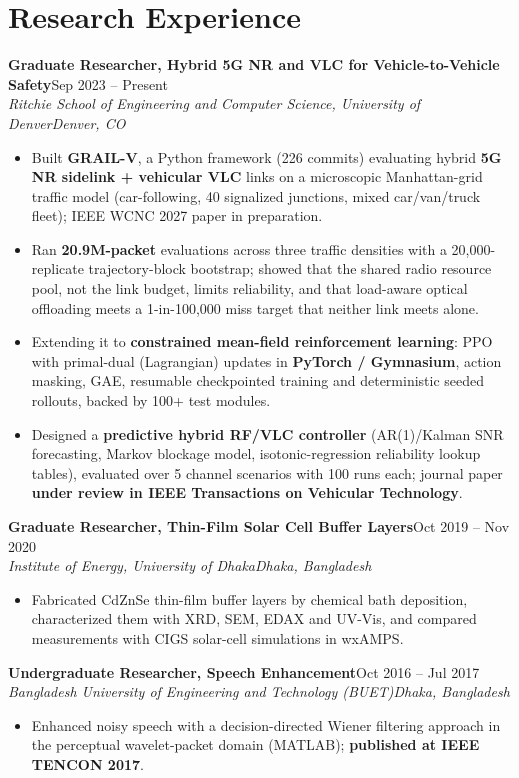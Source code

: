 \documentclass[10pt,letterpaper]{article}
\newcommand{\entry}[4]{\textbf{#1}\hfill #2\\\textit{#3}\hfill\textit{#4}\par}
\begin{document}
\section*{Research Experience}
\entry{Graduate Researcher, Hybrid 5G NR and VLC for Vehicle-to-Vehicle Safety}{Sep 2023 – Present}{Ritchie School of Engineering and Computer Science, University of Denver}{Denver, CO}
\begin{itemize}\item Built \textbf{GRAIL-V}, a Python framework (226 commits) evaluating hybrid \textbf{5G NR sidelink + vehicular VLC} links on a microscopic Manhattan-grid traffic model (car-following, 40 signalized junctions, mixed car/van/truck fleet); IEEE WCNC 2027 paper in preparation.\item Ran \textbf{20.9M-packet} evaluations across three traffic densities with a 20,000-replicate trajectory-block bootstrap; showed that the shared radio resource pool, not the link budget, limits reliability, and that load-aware optical offloading meets a 1-in-100,000 miss target that neither link meets alone.\item Extending it to \textbf{constrained mean-field reinforcement learning}: PPO with primal-dual (Lagrangian) updates in \textbf{PyTorch / Gymnasium}, action masking, GAE, resumable checkpointed training and deterministic seeded rollouts, backed by 100+ test modules.\item Designed a \textbf{predictive hybrid RF/VLC controller} (AR(1)/Kalman SNR forecasting, Markov blockage model, isotonic-regression reliability lookup tables), evaluated over 5 channel scenarios with 100 runs each; journal paper \textbf{under review in IEEE Transactions on Vehicular Technology}.\end{itemize}
\vspace{2pt}
\entry{Graduate Researcher, Thin-Film Solar Cell Buffer Layers}{Oct 2019 – Nov 2020}{Institute of Energy, University of Dhaka}{Dhaka, Bangladesh}
\begin{itemize}\item Fabricated CdZnSe thin-film buffer layers by chemical bath deposition, characterized them with XRD, SEM, EDAX and UV-Vis, and compared measurements with CIGS solar-cell simulations in wxAMPS.\end{itemize}
\vspace{2pt}
\entry{Undergraduate Researcher, Speech Enhancement}{Oct 2016 – Jul 2017}{Bangladesh University of Engineering and Technology (BUET)}{Dhaka, Bangladesh}
\begin{itemize}\item Enhanced noisy speech with a decision-directed Wiener filtering approach in the perceptual wavelet-packet domain (MATLAB); \textbf{published at IEEE TENCON 2017}.\end{itemize}
\vspace{2pt}
\end{document}
